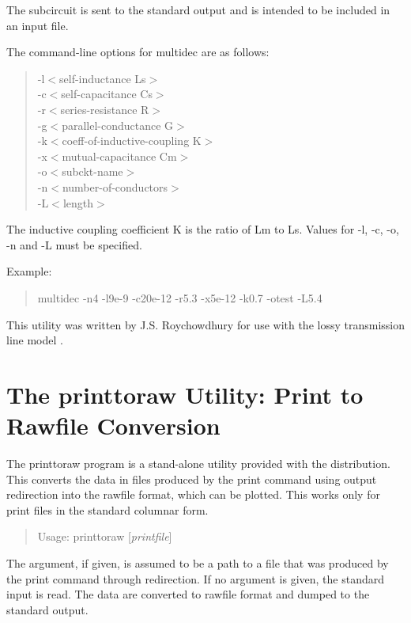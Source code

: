 The subcircuit is sent to the standard output and is intended to be
included in an input file.

The command-line options for {\vt multidec} are as follows:
\begin{quote}
{\vt -l}$<$self-inductance Ls$>$\\
{\vt -c}$<$self-capacitance Cs$>$\\
{\vt -r}$<$series-resistance R$>$\\
{\vt -g}$<$parallel-conductance G$>$\\
{\vt -k}$<$coeff-of-inductive-coupling K$>$\\
{\vt -x}$<$mutual-capacitance Cm$>$\\
{\vt -o}$<$subckt-name$>$\\
{\vt -n}$<$number-of-conductors$>$\\
{\vt -L}$<$length$>$
\end{quote}

The inductive coupling coefficient K is the ratio of Lm
to Ls. Values for -l, -c, -o, -n and -L must be specified.

Example:
\begin{quote}
{\vt multidec -n4 -l9e-9 -c20e-12 -r5.3 -x5e-12 -k0.7 -otest -L5.4}
\end{quote}

This utility was written by J.S.  Roychowdhury for use with the lossy
transmission line model \cite{ltra}.


\section{The {\vt printtoraw} Utility: Print to Rawfile Conversion}


The {\vt printtoraw} program is a stand-alone utility provided with
the {\WRspice} distribution.  This converts the data in files produced
by the {\et print} command using output redirection into the rawfile
format, which can be plotted.  This works only for print files in the
standard columnar form.

\begin{quote}
Usage: {\vt printtoraw} [{\it printfile\/}]
\end{quote}

The argument, if given, is assumed to be a path to a file that was
produced by the {\WRspice} {\et print} command through redirection. 
If no argument is given, the standard input is read.  The data are
converted to rawfile format and dumped to the standard output.

